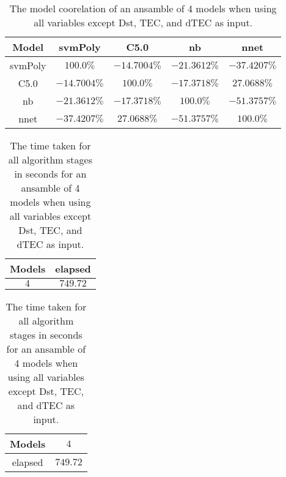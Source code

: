 \begin{table}[!ht]
	\centering
	\begin{tabular}{|c|c|c|c|c|}
		\hline
		Model & svmPoly & C5.0 & nb & nnet \\ \hline
		svmPoly & $100.0\%$ & $-14.7004\%$ & $-21.3612\%$ & $-37.4207\%$ \\ \hline
		C5.0 & $-14.7004\%$ & $100.0\%$ & $-17.3718\%$ & $27.0688\%$ \\ \hline
		nb & $-21.3612\%$ & $-17.3718\%$ & $100.0\%$ & $-51.3757\%$ \\ \hline
		nnet & $-37.4207\%$ & $27.0688\%$ & $-51.3757\%$ & $100.0\%$ \\ \hline
	\end{tabular}
	\caption{The model coorelation of an ansamble of 4 models when using all variables except Dst, TEC, and dTEC as input.}
	\label{tab:ansamble4:noTEC}
\end{table}

\begin{table}[!ht]
	\centering
	\begin{tabular}{|c|c|}
		\hline
		Models & elapsed \\ \hline
		$4$ & $749.72$ \\ \hline
	\end{tabular}
	\caption{The time taken for all algorithm stages in seconds for an ansamble of 4 models when using all variables except Dst, TEC, and dTEC as input.}
	\label{tab:time:ansamble:noTEC:4}
\end{table}

\begin{table}[!ht]
	\centering
	\begin{tabular}{|c|c|}
		\hline
		Models & $4$ \\ \hline
		elapsed & $749.72$ \\ \hline
	\end{tabular}
	\caption{The time taken for all algorithm stages in seconds for an ansamble of 4 models when using all variables except Dst, TEC, and dTEC as input.}
	\label{tab:time:ansamble:reverse:noTEC:4}
\end{table}

